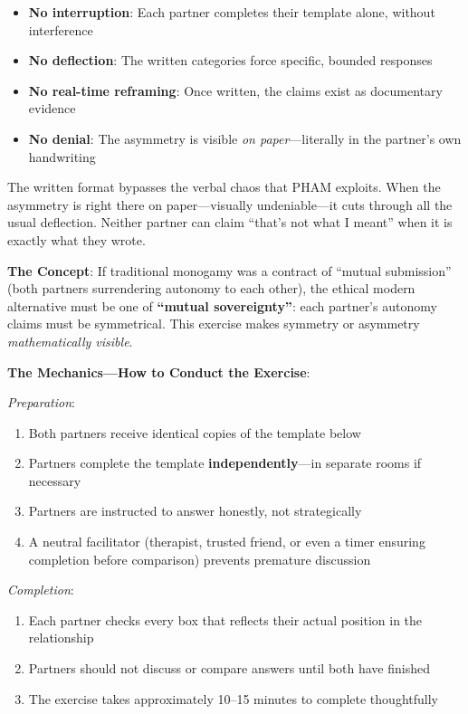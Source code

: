 \documentclass[12pt,openany]{book}
\numberwithin{equation}{chapter}
\begin{document}
\begin{itemize}
    \item \textbf{No interruption}: Each partner completes their template alone, without interference
    \item \textbf{No deflection}: The written categories force specific, bounded responses
    \item \textbf{No real-time reframing}: Once written, the claims exist as documentary evidence
    \item \textbf{No denial}: The asymmetry is visible \textit{on paper}---literally in the partner's own handwriting
\end{itemize}

The written format bypasses the verbal chaos that PHAM exploits. When the asymmetry is right there on paper---visually undeniable---it cuts through all the usual deflection. Neither partner can claim ``that's not what I meant'' when it is exactly what they wrote.

\textbf{The Concept}: If traditional monogamy was a contract of ``mutual submission'' (both partners surrendering autonomy to each other), the ethical modern alternative must be one of \textbf{``mutual sovereignty''}: each partner's autonomy claims must be symmetrical. This exercise makes symmetry or asymmetry \textit{mathematically visible}.

\textbf{The Mechanics---How to Conduct the Exercise}:

\textit{Preparation}:
\begin{enumerate}
    \item Both partners receive identical copies of the template below
    \item Partners complete the template \textbf{independently}---in separate rooms if necessary
    \item Partners are instructed to answer honestly, not strategically
    \item A neutral facilitator (therapist, trusted friend, or even a timer ensuring completion before comparison) prevents premature discussion
\end{enumerate}

\textit{Completion}:
\begin{enumerate}
    \item Each partner checks every box that reflects their actual position in the relationship
    \item Partners should not discuss or compare answers until both have finished
    \item The exercise takes approximately 10--15 minutes to complete thoughtfully
\end{enumerate}
\end{document}
